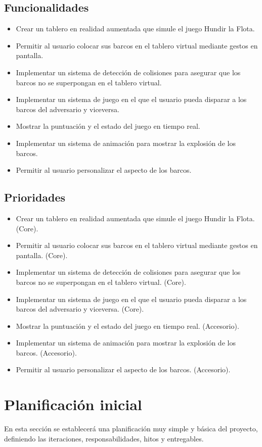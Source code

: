 \documentclass[a4paper,openright,12pt]{article}
\begin{document}
\subsection{Funcionalidades}
\begin{itemize}
\item Crear un tablero en realidad aumentada que simule el juego Hundir la Flota.
\item Permitir al usuario colocar sus barcos en el tablero virtual mediante gestos en pantalla.
\item Implementar un sistema de detección de colisiones para asegurar que los barcos no se superpongan en el tablero virtual.
\item Implementar un sistema de juego en el que el usuario pueda disparar a los barcos del adversario y viceversa.
\item Mostrar la puntuación y el estado del juego en tiempo real.
\item Implementar un sistema de animación para mostrar la explosión de los barcos.
\item Permitir al usuario personalizar el aspecto de los barcos.
\end{itemize}
\subsection{Prioridades}
\begin{itemize}
\item Crear un tablero en realidad aumentada que simule el juego Hundir la Flota. (Core).
\item Permitir al usuario colocar sus barcos en el tablero virtual mediante gestos en pantalla. (Core).
\item Implementar un sistema de detección de colisiones para asegurar que los barcos no se superpongan en el tablero virtual. (Core).
\item Implementar un sistema de juego en el que el usuario pueda disparar a los barcos del adversario y viceversa. (Core).
\item Mostrar la puntuación y el estado del juego en tiempo real. (Accesorio).
\item Implementar un sistema de animación para mostrar la explosión de los barcos. (Accesorio).
\item Permitir al usuario personalizar el aspecto de los barcos. (Accesorio).
\end{itemize}

\section{Planificación inicial}
En esta sección se establecerá una planificación muy simple y básica del proyecto, definiendo las iteraciones, responsabilidades, hitos y entregables.
\end{document}
